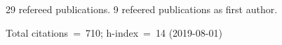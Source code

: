 29 refereed publications. 9 refeered publications as first author.

Total citations~=~710; h-index~=~14 (2019-08-01)